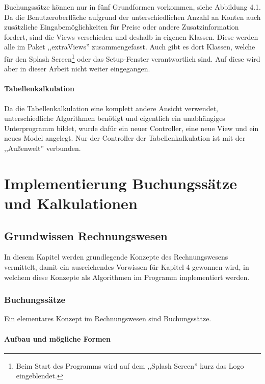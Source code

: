 \documentclass[12pt]{report}
\begin{document}
Buchungssätze können nur in fünf Grundformen vorkommen, siehe Abbildung 4.1. Da die Benutzeroberfläche aufgrund der unterschiedlichen Anzahl an Konten auch zusätzliche Eingabemöglichkeiten für Preise oder andere Zusatzinformation fordert, sind die Views verschieden und deshalb in eigenen Klassen. 
Diese werden alle im Paket ,,extraViews'' zusammengefasst. Auch gibt es dort Klassen, welche für den Splash Screen\footnote{Beim Start des Programms wird auf dem ,,Splash Screen'' kurz das Logo eingeblendet.} oder das Setup-Fenster verantwortlich sind. Auf diese wird aber in dieser Arbeit nicht weiter eingegangen.

\subsection{Tabellenkalkulation}
Da die Tabellenkalkulation eine komplett andere Ansicht verwendet, unterschiedliche Algorithmen benötigt und eigentlich ein unabhängiges Unterprogramm bildet, wurde dafür ein neuer Controller, eine neue View und ein neues Model angelegt. Nur der Controller der Tabellenkalkulation ist mit der ,,Außenwelt'' verbunden.







 





\part{Implementierung Buchungssätze und Kalkulationen}
 
 
\chapter{Grundwissen Rechnungswesen}
In diesem Kapitel werden grundlegende Konzepte des Rechnungswesens vermittelt, damit ein ausreichendes Vorwissen für Kapitel 4 gewonnen wird, in welchem diese Konzepte als Algorithmen im Programm implementiert werden.
 
 
\section{Buchungssätze}
Ein elementares Konzept im Rechnungswesen sind Buchungssätze. 
 
\subsection{Aufbau und mögliche Formen}
 
\end{document}
